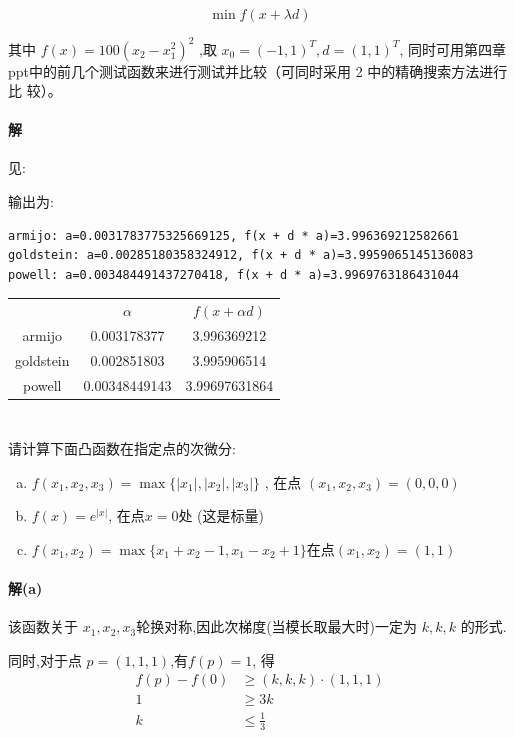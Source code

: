 \documentclass[a4paper]{article}
\begin{document}
\[ \min f(x + \lambda d)\]

其中 \(f(x)=100(x_2 - x_1^2)^2 \) ,取 \(x_0 = (-1,1)^T, d = (1,1)^T\), 同时可用第四章
ppt中的前几个测试函数来进行测试并比较（可同时采用 2 中的精确搜索方法进行比
较）。

\paragraph{解}

见:

输出为:
\begin{lstlisting}
armijo: a=0.0031783775325669125, f(x + d * a)=3.996369212582661
goldstein: a=0.00285180358324912, f(x + d * a)=3.9959065145136083
powell: a=0.003484491437270418, f(x + d * a)=3.9969763186431044
\end{lstlisting}

\begin{table}[H]
    \centering
    \begin{tabular}{ccc}
                &$\alpha$ & $f(x + \alpha d)$ \\
         armijo & 0.003178377 & 3.996369212 \\
         goldstein & 0.002851803 & 3.995906514 \\
         powell & 0.00348449143 & 3.99697631864
    \end{tabular}
\end{table}

\section{}

请计算下面凸函数在指定点的次微分:
\begin{enumerate}[(a)]
    \item \(f(x_1,x_2,x_3) = \max\{|x_1|,|x_2|,|x_3|\}\) , 在点 \((x_1,x_2,x_3) = (0,0,0)\)
    \item \(f(x) = e^{|x|}\), 在点\(x=0\)处 (这是标量)
    \item \(f(x_1,x_2) = \max\{x_1+x_2-1,x_1-x_2+1\}\)在点\((x_1,x_2) = (1,1)\) 
\end{enumerate}

\paragraph{解(a)}
该函数关于 \(x_1,x_2,x_3\)轮换对称,因此次梯度(当模长取最大时)一定为 \(k,k,k\) 的形式.

同时,对于点 \(p=(1,1,1)\),有\(f(p) = 1\), 得 
\[\begin{aligned}
     f(p) - f(0) &\geq (k,k,k) \cdot (1,1,1)\\
     1 &\geq 3k \\
     k &\leq \frac{1}{3}
\end{aligned}\]
\end{document}

